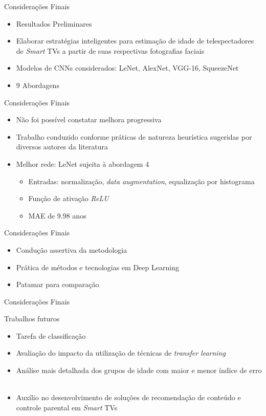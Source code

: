 \begin{frame}{Considerações Finais}
	\begin{itemize}
		\item \alert{Resultados Preliminares}
		\item Elaborar estratégias inteligentes para estimação de idade de telespectadores de  \emph{Smart} TVs a partir de suas respectivas fotografias faciais\\
		\item Modelos de CNNs considerados: LeNet, AlexNet, VGG-16, SqueezeNet
		\item 9 Abordagens
  \end{itemize}
\end{frame}

\begin{frame}{Considerações Finais}
	\begin{itemize}
		\item Não foi possível constatar melhora progressiva
		\item Trabalho conduzido conforme práticas de natureza heurística sugeridas por diversos autores da literatura
		\ \ \newline
		\item Melhor rede: \alert{LeNet sujeita à abordagem 4}
		\begin{itemize}
			\item Entradas: normalização, \emph{data augmentation}, equalização por histograma
			\item Função de ativação \emph{ReLU}
			\item MAE de $9.98$ anos
		\end{itemize}
  \end{itemize}
\end{frame}

\begin{frame}{Considerações Finais}
	\begin{itemize}
		\item Condução assertiva da metodologia
		\item	Prática de métodos e tecnologias em \alert{Deep Learning}
		\item Patamar para comparação
  \end{itemize}
\end{frame}

\begin{frame}{Considerações Finais}
	\begin{block}{Trabalhos futuros}
		\begin{itemize}
			\item Tarefa de classificação
			\item Avaliação do impacto da utilização de técnicas de \emph{transfer learning}
			\ \ \newline
			\item  Análise mais detalhada dos grupos de idade com maior e menor índice de erro
			\ \ \newline
			\item Auxílio no desenvolvimento de soluções de recomendação de conteúdo e controle parental em \emph{Smart} TVs
		\end{itemize}
	\end{block}
\end{frame}

